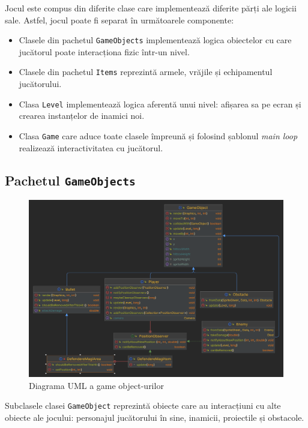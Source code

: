\documentclass{article}
\begin{document}
    Jocul este compus din diferite clase care implementează diferite părți ale logicii sale. Astfel,
    jocul poate fi separat în următoarele componente:
    \begin{itemize}
        \item Clasele din pachetul \texttt{GameObjects} implementează logica obiectelor cu care
        jucătorul poate interacționa fizic într-un nivel.
        \item Clasele din pachetul \texttt{Items} reprezintă armele, vrăjile și echipamentul
        jucătorului.
        \item Clasa \texttt{Level} implementează logica aferentă unui nivel: afișarea sa pe ecran
        și crearea instanțelor de inamici noi.
        \item Clasa \texttt{Game} care aduce toate clasele împreună și folosind șablonul
        \emph{main loop} realizează interactivitatea cu jucătorul.
    \end{itemize}

    \subsection{Pachetul \texttt{GameObjects}}
    \begin{figure}[H]
        \includegraphics[width=\linewidth]{gameobjects-diagram}
        \centering
        \caption{Diagrama UML a game object-urilor}
    \end{figure}

    Subclasele clasei \texttt{GameObject} reprezintă obiecte care au interacțiuni cu alte obiecte
    ale jocului: personajul jucătorului în sine, inamicii, proiectile și obstacole.
\end{document}

